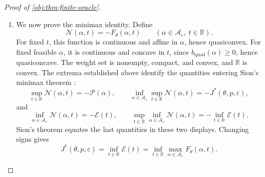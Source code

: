 \documentclass[11pt]{article}
\begin{document}
\begin{proof}[Proof of \cref{obj:thm:finite-oracle}]
\begin{enumerate}
For the first singleton pattern,
\[
g_{\{x_0\}}
=
\begin{pmatrix}-(e^\varepsilon-1)(1-p)\\0\end{pmatrix}.
\]
Define the positive envelope coefficient
\[
\eta_{\mathrm{env}}
=
\frac{(e^\varepsilon-1)^2(1-p)^2}
{(e^\varepsilon+1)h_{\{x_0\}}(\theta)}>0.
\]
Nonnegativity of every summand yields
\[
\eta_{\mathrm{env}}t^2
\le F_\theta(\alpha_{\mathrm{pair}},t)
\le\mathscr E(t)
\qquad(t\in\mathbb R).
\]
Hence the sublevel set at \(\mathscr E(0)\) satisfies
\[
\{t\in\mathbb R:\mathscr E(t)\le\mathscr E(0)\}
\subseteq
\left[
-\sqrt{\frac{\mathscr E(0)}{\eta_{\mathrm{env}}}},
\sqrt{\frac{\mathscr E(0)}{\eta_{\mathrm{env}}}}
\right].
\]
It is nonempty and closed, and therefore compact. Minimizing on
this set gives a coordinate \(t_{\mathrm{env}}\in\mathbb R\) with
\[
\mathscr E(t_{\mathrm{env}})
\le\mathscr E(t)
\qquad(t\in\mathbb R).
\]

\item We now prove the minimax identity. Define
\[
\mathscr N(\alpha,t)=-F_\theta(\alpha,t)
\qquad
(\alpha\in\mathcal A_\varepsilon,\ t\in\mathbb R).
\]
For fixed \(t\), this function is continuous and affine in
\(\alpha\), hence quasiconvex. For fixed feasible \(\alpha\), it is
continuous and concave in \(t\), since
\(b_{\mathrm{quad}}(\alpha)\ge0\), hence quasiconcave. The weight
set is nonempty, compact, and convex, and \(\mathbb R\) is convex.
The extrema established above identify the quantities entering
Sion's minimax theorem \citep{Sion1958}:
\[
\sup_{t\in\mathbb R}\mathscr N(\alpha,t)=-\mathscr P(\alpha),
\qquad
\inf_{\alpha\in\mathcal A_\varepsilon}
\sup_{t\in\mathbb R}\mathscr N(\alpha,t)
=-J^*(\theta,p,\varepsilon),
\]
and
\[
\inf_{\alpha\in\mathcal A_\varepsilon}\mathscr N(\alpha,t)
=-\mathscr E(t),
\qquad
\sup_{t\in\mathbb R}
\inf_{\alpha\in\mathcal A_\varepsilon}\mathscr N(\alpha,t)
=-\inf_{t\in\mathbb R}\mathscr E(t).
\]
Sion's theorem equates the last quantities in these two displays.
Changing signs gives
\[
J^*(\theta,p,\varepsilon)
=
\inf_{t\in\mathbb R}\mathscr E(t)
=
\inf_{t\in\mathbb R}
\max_{\alpha\in\mathcal A_\varepsilon}F_\theta(\alpha,t).
\]


\end{enumerate}
\end{proof}
\end{document}
